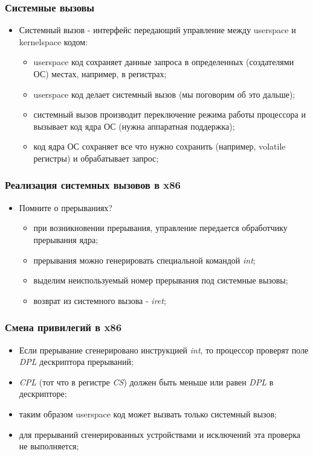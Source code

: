 \begin{frame}
\frametitle{Системные вызовы}
\begin{itemize}
  \item Системный вызов - интерфейс передающий управление между userspace и kernelspace кодом:
    \begin{itemize}
      \item userspace код сохраняет данные запроса в определенных (создателями ОС) местах, например, в регистрах;
      \item userspace код делает системный вызов (мы поговорим об это дальше);
      \item системный вызов производит переключение режима работы процессора и вызывает код ядра ОС (нужна аппаратная поддержка);
      \item код ядра ОС сохраняет все что нужно сохранить (например, volatile регистры) и обрабатывает запрос;
    \end{itemize}
\end{itemize}
\end{frame}

\begin{frame}
\frametitle{Реализация системных вызовов в x86}
\begin{itemize}
  \item Помните о прерываниях?
    \begin{itemize}
      \item при возникновении прерывания, управление передается обработчику прерывания ядра;
      \item прерывания можно генерировать специальной командой \emph{int};
      \item выделим неиспользуемый номер прерывания под системные вызовы;
      \item возврат из системного вызова - \emph{iret};
    \end{itemize}
\end{itemize}
\end{frame}

\begin{frame}
\frametitle{Смена привилегий в x86}
\begin{itemize}
  \item Если прерывание сгенерировано инструкцией \emph{int}, то процессор проверят поле \emph{DPL} дескриптора прерываний;
  \item \emph{CPL} (тот что в регистре \emph{CS}) должен быть меньше или равен \emph{DPL} в дескрипторе;
  \item таким образом userspace код может вызвать только системный вызов;
  \item для прерываний сгенерированных устройствами и исключений эта проверка не выполняется;
\end{itemize}
\end{frame}

